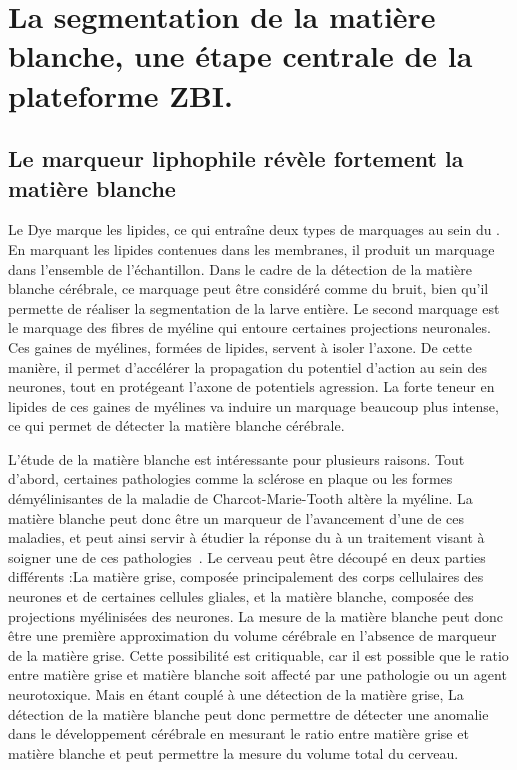 \documentclass[\main/main.tex]{subfiles}
\begin{document}
\section{\label{sec:algo:white}
La segmentation de la matière blanche, une étape centrale de la plateforme ZBI.
}

\subsection{Le marqueur liphophile révèle fortement la matière blanche}

%
Le Dye marque les lipides, ce qui entraîne deux types de marquages au sein du \pz{}.
%
En marquant les lipides contenues dans les membranes, il produit un marquage dans l'ensemble de l'échantillon.
%
Dans le cadre de la détection de la matière blanche cérébrale, ce marquage peut être considéré comme du bruit, bien qu'il permette de réaliser la segmentation de la larve entière.
%
Le second marquage est le marquage des fibres de myéline qui entoure certaines projections neuronales.
%
Ces gaines de myélines, formées de lipides, servent à isoler l'axone.
%
De cette manière, il permet d'accélérer la propagation du potentiel d'action au sein des neurones, tout en protégeant l'axone de potentiels agression.
%
La forte teneur en lipides de ces gaines de myélines va induire un marquage beaucoup plus intense, ce qui permet de détecter la matière blanche cérébrale.

%
L'étude de la matière blanche est intéressante pour plusieurs raisons.
%
Tout d'abord, certaines pathologies comme la sclérose en plaque ou les formes démyélinisantes de la  maladie de Charcot\hyp{}Marie\hyp{}Tooth altère la myéline.
%
La matière blanche peut donc être un marqueur de l'avancement d'une de ces maladies, et peut ainsi servir à étudier la réponse du \pz{} à un traitement visant à soigner une de ces pathologies~\cite{burrows_2019,kulkarni_2017}.
%
Le cerveau peut être découpé en deux parties différents :La matière grise, composée principalement des corps cellulaires des neurones et de certaines cellules gliales, et la matière blanche, composée des projections myélinisées des neurones.
%
La mesure de la matière blanche peut donc être une première approximation du volume cérébrale en l'absence de marqueur de la matière grise.
%
Cette possibilité est critiquable, car il est possible que le ratio entre matière grise et matière blanche soit affecté par une pathologie ou un agent neurotoxique.
%
Mais en étant couplé à une détection de la matière grise, La détection de la matière blanche peut donc permettre de détecter une anomalie dans le développement cérébrale en mesurant le ratio entre matière grise et matière blanche et peut permettre la mesure du volume total du cerveau.
\end{document}
